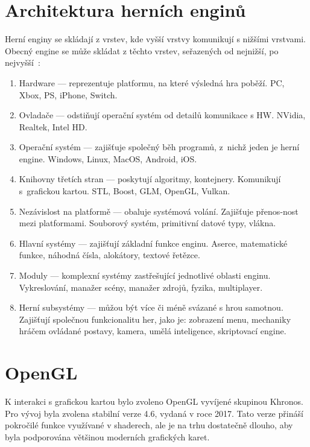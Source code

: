 \documentclass[thesis=M,czech]{FITthesis}[2019/12/23]
\begin{document}
\section{Architektura herních enginů}

Herní enginy se skládají z vrstev, kde vyšší vrstvy komunikují s nižšími vrstvami. Obecný engine se může skládat z těchto vrstev, seřazených od nejnižší, po nejvyšší~\cite{gea_engine_arch}:

\begin{enumerate}

\item Hardware --- reprezentuje platformu, na které výsledná hra poběží. PC, Xbox, PS, iPhone, Switch.

\item Ovladače --- odstiňují operační systém od detailů komunikace s HW. \mbox{NVidia}, Realtek, Intel HD.

\item Operační systém --- zajišťuje společný běh programů, z~nichž jeden je herní engine. Windows, Linux, MacOS, Android, iOS.

\item Knihovny třetích stran --- poskytují algoritmy, kontejnery. Komunikují s~grafickou kartou. STL, Boost, GLM, OpenGL, Vulkan.

\item Nezávislost na platformě --- obaluje systémová volání. Zajišťuje přenos-nost mezi platformami. Souborový systém, primitivní datové typy, vlákna.

\item Hlavní systémy --- zajišťují základní funkce enginu. Aserce, matematické funkce, náhodná čísla, alokátory, textové řetězce.

\item Moduly --- komplexní systémy zastřešující jednotlivé oblasti enginu. Vykreslování, manažer scény, manažer zdrojů, fyzika, multiplayer.

\item Herní subsystémy --- můžou být více či méně svázané s hrou samotnou. Zajišťují společnou funkcionalitu her, jako je: zobrazení menu, mechaniky hráčem ovládané postavy, kamera, umělá inteligence, skriptovací engine.

\end{enumerate}

\section{OpenGL}
K interakci s grafickou kartou bylo zvoleno OpenGL vyvíjené skupinou Khronos. Pro vývoj byla zvolena stabilní verze 4.6, vydaná v roce 2017. Tato verze přináší pokročilé funkce využívané v shaderech, ale je na trhu dostatečně dlouho, aby byla podporována většinou moderních grafických karet.
\end{document}
